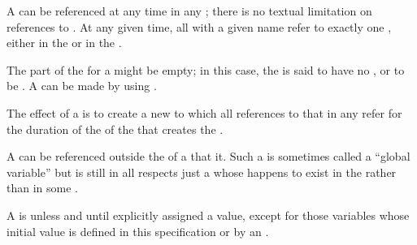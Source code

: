 
\endlist

A  can be referenced at any time in any ;
there is no textual limitation on references to .
At any given time, all  with a given name refer to 
exactly one , either in the 
or in the .

The  part of the  for a  might
be empty; in this case, the  is said to have no ,
or to be .  A  can be made 
by using .
           
The effect of  a  is to create
a new  to which all references to that 
in any  refer for the duration of the  of the 
that creates the .


A  can be referenced outside the  of
a  that  it.  Such a  is sometimes called 
a ``global variable'' but is still in all respects just a 
whose  happens to exist in the  rather than in some
.

A  is 
unless and until explicitly assigned a value, except for 
those variables whose initial value is 
defined in this specification or by an .

